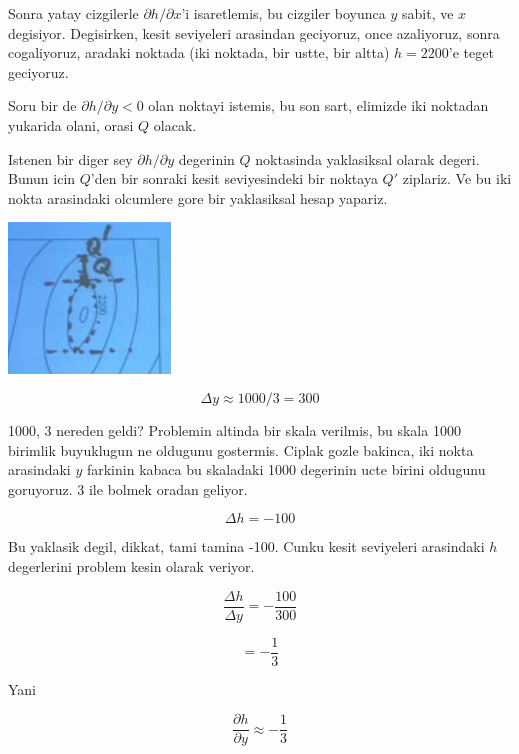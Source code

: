 \documentclass[12pt,fleqn]{article}\usepackage{../common}
\begin{document}
Sonra yatay cizgilerle $\partial h/\partial x$'i isaretlemis, bu cizgiler
boyunca $y$ sabit, ve $x$ degisiyor. Degisirken, kesit seviyeleri arasindan
geciyoruz, once azaliyoruz, sonra cogaliyoruz, aradaki noktada (iki
noktada, bir ustte, bir altta) $h=2200$'e teget geciyoruz. 

Soru bir de  $\partial h/\partial y < 0$ olan noktayi istemis, bu son sart,
elimizde iki noktadan yukarida olani, orasi $Q$ olacak. 

Istenen bir diger sey $\partial h/\partial y$ degerinin $Q$ noktasinda
yaklasiksal olarak degeri. Bunun icin $Q$'den bir sonraki kesit
seviyesindeki bir noktaya $Q'$ ziplariz. Ve bu iki nokta arasindaki
olcumlere gore bir yaklasiksal hesap yapariz. 

\includegraphics[height=4cm]{15_4.png}


\[ \Delta y \approx 1000 / 3 = 300 \]

1000, 3 nereden geldi? Problemin altinda bir skala verilmis, bu skala 1000
birimlik buyuklugun ne oldugunu gostermis. Ciplak gozle bakinca, iki nokta
arasindaki $y$ farkinin kabaca bu skaladaki 1000 degerinin ucte birini
oldugunu goruyoruz. 3 ile bolmek oradan geliyor. 

\[ \Delta h = -100 \]

Bu yaklasik degil, dikkat, tami tamina -100. Cunku kesit seviyeleri
arasindaki $h$ degerlerini problem kesin olarak veriyor.

\[ 
\frac{\Delta h}{\Delta y} = -\frac{100}{300}
 \]

\[ = -\frac{1}{3} \]

Yani 

\[ 
\frac{\partial h}{\partial y} \approx -\frac{1}{3}
 \]
\end{document}
